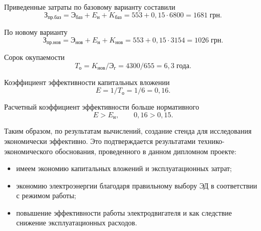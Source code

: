        Приведенные затраты по базовому варианту составили
        \begin{equation*}
            \text{З}_\text{пр.баз} = 
                \text{Э}_\text{баз} + E_\text{н} + K_\text{баз} = 
                    553 + 0,15 \cdot 6800 = 1681 \; \text{грн}.
        \end{equation*}

        По новому варианту
        \begin{equation*}
            \text{З}_\text{пр.нов} = 
                \text{Э}_\text{нов} + E_\text{н} + K_\text{нов} = 
                    553 + 0,15 \cdot 3154 = 1026 \; \text{грн}.
        \end{equation*}

        Сорок окупаемости
        \begin{equation*}
            T_\text{о} = K_\text{нов} / \text{Э}_\text{г} = 
                4300 / 655 = 6,3 \; \text{года}.
        \end{equation*}

        Коэффициент эффективности капитальных вложении
        \begin{equation*}
            E = 1 / T_\text{о} = 1 / 6 = 0,16.
        \end{equation*}

       Расчетный коэффициент эффективности больше нормативного 
        \begin{equation*}
            E > E_\text{н},\qquad 0,16 > 0,15. 
        \end{equation*}

        Таким образом, по результатам вычислений, создание стенда для
        исследования экономически эффективно. Это подтверждается результатами
        технико-экономического обоснования, проведенного в данном дипломном
        проекте:
        \begin{itemize}
            \item имеем экономию капитальных вложений и эксплуатационных
                затрат;
            \item экономию электроэнергии благодаря правильному выбору ЭД в
                соответствии с режимом работы;
            \item повышение эффективности работы электродвигателя и как
                следствие снижение эксплуатационных расходов.
        \end{itemize}
